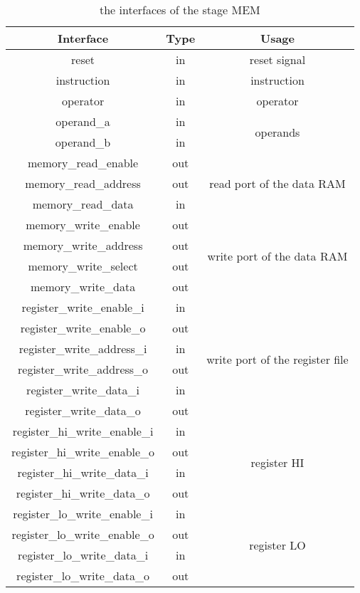 \begin{table}[!h]
\centering
\begin{tabular}{|c|c|c|}
\hline
Interface & Type & Usage \\ \hline
reset & in & reset signal \\ \hline
instruction & in & instruction \\ \hline
operator & in & operator \\ \hline
operand\_a & in & \multirow{2}{*}{operands} \\ \cline{1-2}
operand\_b & in &  \\ \hline
memory\_read\_enable & out & \multirow{3}{*}{read port of the data RAM} \\ \cline{1-2}
memory\_read\_address & out &  \\ \cline{1-2}
memory\_read\_data & in &  \\ \hline
memory\_write\_enable & out & \multirow{4}{*}{write port of the data RAM} \\ \cline{1-2}
memory\_write\_address & out &  \\ \cline{1-2}
memory\_write\_select & out &  \\ \cline{1-2}
memory\_write\_data & out &  \\ \hline
register\_write\_enable\_i & in & \multirow{6}{*}{write port of the register file} \\ \cline{1-2}
register\_write\_enable\_o & out &  \\ \cline{1-2}
register\_write\_address\_i & in &  \\ \cline{1-2}
register\_write\_address\_o & out &  \\ \cline{1-2}
register\_write\_data\_i & in &  \\ \cline{1-2}
register\_write\_data\_o & out &  \\ \hline
register\_hi\_write\_enable\_i & in & \multirow{4}{*}{register HI} \\ \cline{1-2}
register\_hi\_write\_enable\_o & out &  \\ \cline{1-2}
register\_hi\_write\_data\_i & in &  \\ \cline{1-2}
register\_hi\_write\_data\_o & out &  \\ \hline
register\_lo\_write\_enable\_i & in & \multirow{4}{*}{register LO} \\ \cline{1-2}
register\_lo\_write\_enable\_o & out &  \\ \cline{1-2}
register\_lo\_write\_data\_i & in &  \\ \cline{1-2}
register\_lo\_write\_data\_o & out &  \\ \hline
\end{tabular}
\caption{the interfaces of the stage MEM}
\end{table}